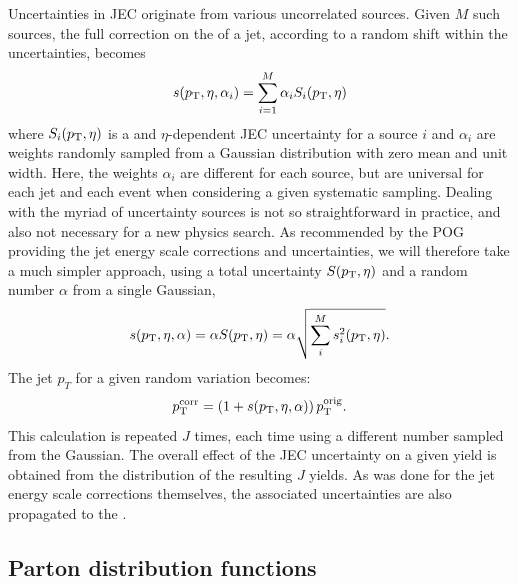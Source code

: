 Uncertainties in JEC originate from various uncorrelated sources.   
Given $M$ such sources, the full correction on the \pt of a jet, according to a random shift
within the uncertainties, becomes 
\begin{equation}
s(p_{\mathrm{T}}, \eta, \alpha_i) = \sum_{i=1}^M \alpha_i S_i (p_{\mathrm{T}}, \eta)
\end{equation}
where $S_i (p_{\mathrm{T}}, \eta)$ is a \pt and $\eta$-dependent JEC uncertainty for a source $i$ and
$\alpha_i$ are weights randomly sampled from a Gaussian distribution with zero mean and unit
width. 
Here, the weights $\alpha_i$ are different for each source, but are universal for each jet and each
event when considering a given systematic sampling.
Dealing with the myriad of uncertainty sources is not so straightforward in practice, and also not
necessary for a new physics search. As recommended by the POG providing the jet energy scale
corrections and uncertainties, we will therefore take a much simpler approach, using a total
uncertainty $S (p_{\mathrm{T}}, \eta)$ and a random number $\alpha$ from a single Gaussian,
\begin{equation}
s(p_{\mathrm{T}}, \eta, \alpha) = \alpha S (p_{\mathrm{T}}, \eta) = \alpha \sqrt {\sum_i^M s_i^2 (p_{\mathrm{T}}, \eta) }.
\end{equation}
The jet $p_T$ for a given random variation becomes:
\begin{equation}
p_{\mathrm{T}}^{\rm corr} = \left(1 + s(p_{\mathrm{T}}, \eta, \alpha)\right) p_{\mathrm{T}}^{\rm orig}.
\end{equation}
This calculation is repeated $J$ times, each time using a different number sampled from the
Gaussian.  
The overall effect of the JEC uncertainty on a given yield is obtained from the distribution of
the resulting $J$ yields.  
As was done for the jet energy scale corrections themselves, the associated uncertainties are also
propagated to the \VEtmiss.


\subsection{Parton distribution functions \label{sec:boost_pdf_unc}} 

